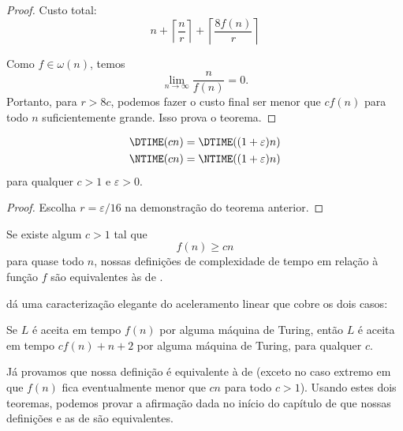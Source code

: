 \begin{proof}
    Custo total:
    \begin{equation*}
        n + \left\lceil \frac n r \right\rceil +
            \left\lceil \frac{8f(n)}{r} \right\rceil
    \end{equation*}

    Como $f \in \omega(n)$, temos
    \begin{equation*}
        \lim_{n \rightarrow \infty} \frac{n}{f(n)} = 0.
    \end{equation*}
    Portanto, para $r > 8c$,
    podemos fazer o custo final
    ser menor que $cf(n)$ para todo $n$ suficientemente grande.
    Isso prova o teorema.
\end{proof}

\begin{theorem}
    \begin{align*}
        \DTIME(cn) &= \DTIME((1+\varepsilon)n) \\
        \NTIME(cn) &= \NTIME((1+\varepsilon)n)
    \end{align*}
    para qualquer $c > 1$ e $\varepsilon > 0$.
\end{theorem}

\begin{proof}
    Escolha $r = \varepsilon/16$ na demonstração do teorema anterior.
\end{proof}

\begin{ucorollary}
    Se existe algum $c > 1$ tal que
    \begin{equation*}
        f(n) \geq cn
    \end{equation*}
    para quase todo $n$,
    nossas definições de complexidade de tempo
    em relação à função $f$
    são equivalentes às de .
\end{ucorollary}

dá uma caracterização elegante do aceleramento linear
que cobre os dois casos:
\begin{utheorem}
    Se $L$ é aceita em tempo $f(n)$ por alguma máquina de Turing,
    então $L$ é aceita em tempo $cf(n) + n + 2$ por alguma máquina de Turing,
    para qualquer $c$.
\end{utheorem}

Já provamos que nossa definição
é equivalente à de 
(exceto no caso extremo
em que $f(n)$ fica eventualmente menor que $cn$
para todo $c > 1$).
Usando estes dois teoremas,
podemos provar a afirmação dada no início do capítulo
de que nossas definições e as de 
são equivalentes.

